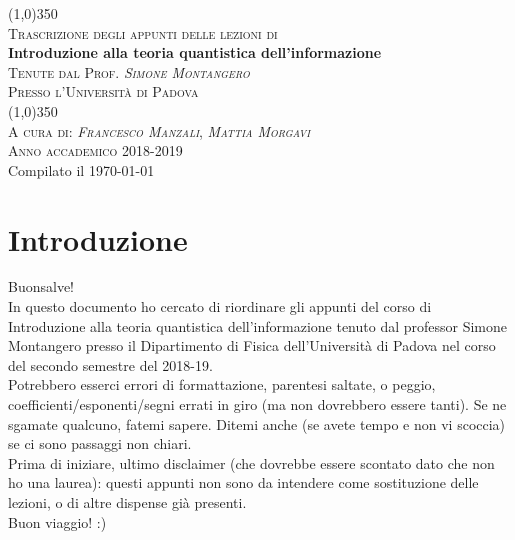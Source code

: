 \documentclass[12pt]{report} %
\makeatletter
\newcommand{\onlyinsubfile}[1]{#1}
\newcommand{\notinsubfile}[1]{}
\renewcommand{\@marginparreset}{%
  \reset@font\small
  \raggedright
  \slshape
  \@setminipage
}
\theoremstyle{plain}
\theoremstyle{definition}
\theoremstyle{remark}
\makeatother
\begin{document}
\renewcommand{\onlyinsubfile}[1]{}
\renewcommand{\notinsubfile}[1]{#1}

\setlength{\aboverulesep}{0pt}
\setlength{\belowrulesep}{0pt}
\setlength{\extrarowheight}{.75ex}
\begin{center}
                \line (1,0){350} \\
                \textsc{\normalsize Trascrizione degli appunti delle lezioni di}\\
                [0.25in]
                \huge{\bfseries Introduzione alla teoria quantistica dell'informazione}\\
                [2mm]
                \textsc{\normalsize Tenute dal Prof. \textit{Simone Montangero}}
                \vspace{-0.5em}\\
                \textsc{\normalsize Presso l'Università di Padova}\\
                \vspace{-1em}
                \line (1,0){350} \\
        [0.2cm]
        \textsc{\normalsize A cura di: \textit{Francesco Manzali}, \textit{Mattia Morgavi}}\\
                \textsc{\normalsize Anno accademico 2018-2019}\\ 
        {\scriptsize Compilato il \today}
\end{center}


\makeatletter
\renewcommand{\@marginparreset}{%
  \reset@font\small
  \raggedright
  \slshape
  \@setminipage
}
\makeatother

\tableofcontents 
\clearpage
\chapter*{Introduzione}
Buonsalve!\\
In questo documento ho cercato di riordinare gli appunti del corso di Introduzione alla teoria quantistica dell'informazione tenuto dal professor Simone Montangero presso il Dipartimento di Fisica dell'Università di Padova nel corso del secondo semestre del 2018-19.\\
Potrebbero esserci errori di formattazione, parentesi saltate, o peggio, coefficienti/esponenti/segni errati in giro (ma non dovrebbero essere tanti). Se ne sgamate qualcuno, fatemi sapere. Ditemi anche (se avete tempo e non vi scoccia) se ci sono passaggi non chiari.\\
Prima di iniziare, ultimo disclaimer (che dovrebbe essere scontato dato che non ho una laurea): questi appunti non sono da intendere come sostituzione delle lezioni, o di altre dispense già presenti.\\
Buon viaggio! :)
\end{document}
